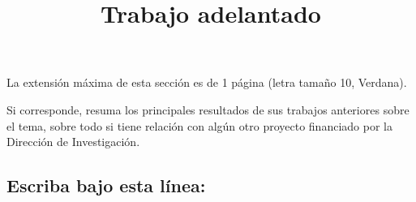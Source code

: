 \documentclass[10pt,prl]{revtex4}
\begin{document}
\title{Trabajo adelantado}
\maketitle

La extensi\'on m\'axima de esta secci\'on es de 1 p\'agina (letra tama\~no 10, Verdana).

Si corresponde, resuma los principales resultados de sus trabajos anteriores sobre el tema, sobre todo si tiene relaci\'on con alg\'un otro proyecto financiado por la Direcci\'on de Investigaci\'on.

\maketitle
\subsection{Escriba bajo esta l\'inea:}
\end{document}
